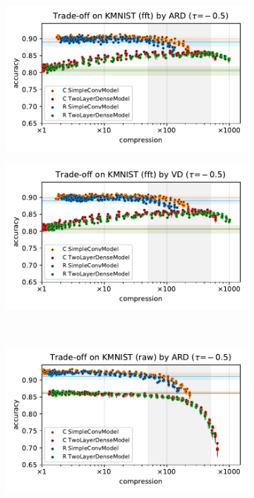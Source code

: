 \documentclass[a4paper,10pt,onecolumn]{article}
\begin{document}
\begin{figure}[b]
\begin{subfigure}[b]{0.5\columnwidth}
    \centering
    \includegraphics[width=\columnwidth]{figure__mnist-like__trade-off/appendix__ARD__kmnist__fft__-0.5.pdf}
  \end{subfigure}%
  \begin{subfigure}[b]{0.5\columnwidth}
    \centering
    \includegraphics[width=\columnwidth]{figure__mnist-like__trade-off/appendix__VD__kmnist__fft__-0.5.pdf}
  \end{subfigure} \\ %
  \begin{subfigure}[b]{0.5\columnwidth}
    \centering
    \includegraphics[width=\columnwidth]{figure__mnist-like__trade-off/appendix__ARD__kmnist__raw__-0.5.pdf}

\end{subfigure}
\end{figure}
\end{document}
